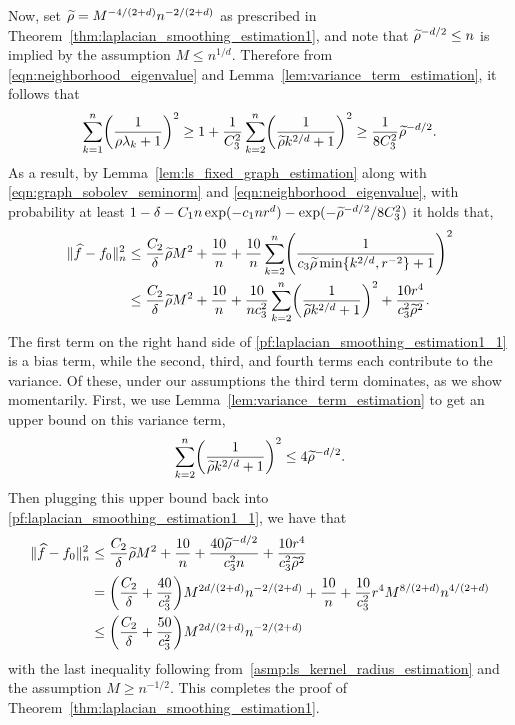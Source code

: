 Now, set $\widetilde{\rho} = M^{-4/(2 + d)}n^{-2/(2 + d)}$ as prescribed in Theorem~\ref{thm:laplacian_smoothing_estimation1}, and note that $\widetilde{\rho}^{-d/2} \leq n$ is implied by the assumption $M \leq n^{1/d}$. Therefore  from \eqref{eqn:neighborhood_eigenvalue} and Lemma~\ref{lem:variance_term_estimation}, it follows that
\begin{equation*}
\sum_{k = 1}^{n}\biggl(\frac{1}{\rho \lambda_k + 1}\biggr)^{2} \geq 1 + \frac{1}{C_3^2}\sum_{k = 2}^{n}\biggl(\frac{1}{\widetilde{\rho} k^{2/d} + 1}\biggr)^{2} \geq \frac{1}{8C_3^2} \widetilde{\rho}^{-d/2}.
\end{equation*}
As a result, by Lemma~\ref{lem:ls_fixed_graph_estimation} along with \eqref{eqn:graph_sobolev_seminorm} and \eqref{eqn:neighborhood_eigenvalue}, with probability at least $1 - \delta - C_1n\exp(-c_1nr^d) - \exp(-\widetilde{\rho}^{-d/2}/8C_3^2)$ it holds that,
\begin{align}
\|\widehat{f} - f_0\|_n^2 & \leq \frac{C_2}{\delta} \widetilde{\rho} M^2 + \frac{10}{n} + \frac{10}{n}\sum_{k = 2}^{n} \Biggl(\frac{1}{c_3 \widetilde{\rho}\min\{k^{2/d},r^{-2}\} + 1}\Biggr)^2 \nonumber \\
& \leq \frac{C_2}{\delta} \widetilde{\rho} M^2 + \frac{10}{n} + \frac{10}{nc_3^2}\sum_{k = 2}^{n} \biggl(\frac{1}{\widetilde{\rho}k^{2/d} + 1}\biggr)^2 + \frac{10r^4}{c_3^2 \widetilde{\rho}^2}. \label{pf:laplacian_smoothing_estimation1_1}
\end{align}
The first term on the right hand side of \eqref{pf:laplacian_smoothing_estimation1_1} is a bias term, while the second, third, and fourth terms each contribute to the variance. Of these, under our assumptions the third term dominates, as we show momentarily. First, we use Lemma~\ref{lem:variance_term_estimation} to get an upper bound on this variance term,
\begin{equation*}
\sum_{k = 2}^{n}\biggl(\frac{1}{\widetilde{\rho}k^{2/d} + 1}\biggr)^2 \leq 4\widetilde{\rho}^{-d/2}.
\end{equation*}
Then plugging this upper bound back into \eqref{pf:laplacian_smoothing_estimation1_1}, we have that
\begin{align*}
\|\widehat{f} - f_0\|_n^2 & \leq\frac{C_2}{\delta} \widetilde{\rho} M^2 + \frac{10}{n} + \frac{40\widetilde{\rho}^{-d/2}}{c_3^{2}n}  + \frac{10r^4}{c_3^2 \widetilde{\rho}^2} \\
& = \biggl(\frac{C_2}{\delta} + \frac{40}{c_3^{2}}\biggr)M^{2d/(2+d)} n^{-2/(2 + d)} + \frac{10}{n} + \frac{10}{c_3^2}r^4M^{8/(2 + d)}n^{4/(2 + d)} \\
& \leq \biggl(\frac{C_2}{\delta} + \frac{50}{c_3^{2}}\biggr)M^{2d/(2+d)} n^{-2/(2 + d)}
\end{align*}
with the last inequality following from~\ref{asmp:ls_kernel_radius_estimation} and the assumption $M \geq n^{-1/2}$. This completes the proof of Theorem~\ref{thm:laplacian_smoothing_estimation1}.

